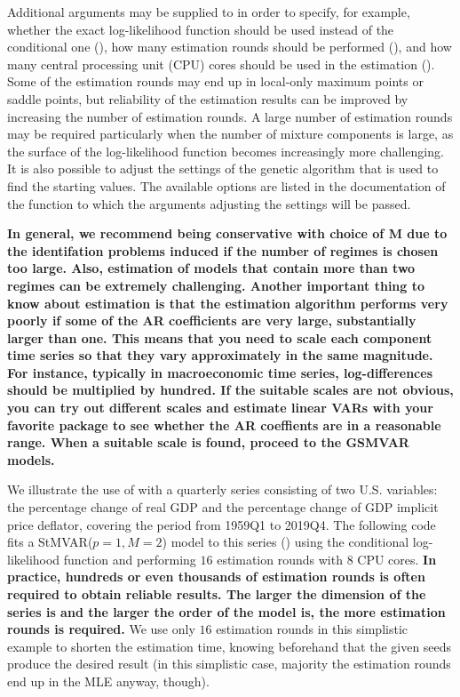 \documentclass[nojss]{jss}
\begin{document}
Additional arguments may be supplied to  in order to specify, for example, whether the exact log-likelihood function should be used instead of the conditional one (), how many estimation rounds should be performed (), and how many central processing unit (CPU) cores should be used in the estimation (). Some of the estimation rounds may end up in local-only maximum points or saddle points, but reliability of the estimation results can be improved by increasing the number of estimation rounds. A large number of estimation rounds may be required particularly when the number of mixture components is large, as the surface of the log-likelihood function becomes increasingly more challenging. It is also possible to adjust the settings of the genetic algorithm that is used to find the starting values. The available options are listed in the documentation of the function  to which the arguments adjusting the settings will be passed.

\textbf{In general, we recommend being conservative with choice of M due to the identifation problems induced if the number of regimes is chosen too large. Also, estimation of models that contain more than two regimes can be extremely challenging. Another important thing to know about estimation is that the estimation algorithm performs very poorly if some of the AR coefficients are very large, substantially larger than one. This means that you need to scale each component time series so that they vary approximately in the same magnitude. For instance, typically in macroeconomic time series, log-differences should be multiplied by hundred. If the suitable scales are not obvious, you can try out different scales and estimate linear VARs with your favorite package to see whether the AR coeffients are in a reasonable range. When a suitable scale is found, proceed to the GSMVAR models.}

We illustrate the use of  with a quarterly series consisting of two U.S. variables: the percentage change of real GDP and the percentage change of GDP implicit price deflator, covering the period from 1959Q1 to 2019Q4. The following code fits a StMVAR($p=1,M=2$) model to this series () using the conditional log-likelihood function and performing $16$ estimation rounds with $8$ CPU cores. \textbf{In practice, hundreds or even thousands of estimation rounds is often required to obtain reliable results. The larger the dimension of the series is and the larger the order of the model is, the more estimation rounds is required.} We use only $16$ estimation rounds in this simplistic example to shorten the estimation time, knowing beforehand that the given seeds produce the desired result (in this simplistic case, majority the estimation rounds end up in the MLE anyway, though).
\end{document}
